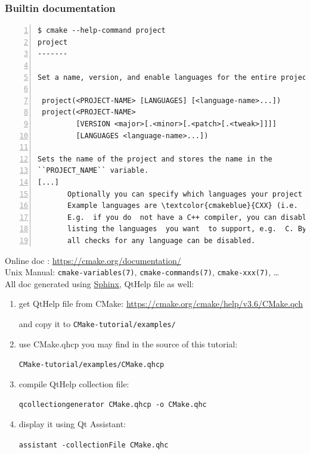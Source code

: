 \documentclass[compress,slidestop,table
              ]
               {beamer}
\begin{document}
\begin{frame}
\frametitle{Builtin documentation}
\begin{Verbatim}[commandchars=\\\{\},fontsize=\tiny,numbers=left,frame=topline,label=CMake builtin doc for 'project' command]
  $ cmake --help-command project
project
-------

Set a name, version, and enable languages for the entire project.

 project(<PROJECT-NAME> [LANGUAGES] [<language-name>...])
 project(<PROJECT-NAME>
         [VERSION <major>[.<minor>[.<patch>[.<tweak>]]]]
         [LANGUAGES <language-name>...])

Sets the name of the project and stores the name in the
``PROJECT_NAME`` variable.
[...]
       Optionally you can specify which languages your project supports.
       Example languages are \textcolor{cmakeblue}{CXX} (i.e.  C++), \textcolor{cmakeblue}{C}, \textcolor{cmakeblue}{Fortran}, etc.  By \textcolor{cmakered}{default C} \textcolor{cmakered}{and CXX are enabled}.
       E.g.  if you do  not have a C++ compiler, you can disable the check  for it by  explicitly
       listing the languages  you want  to support, e.g.  C. By using the special language "\textcolor{cmakeblue}{NONE}"
       all checks for any language can be disabled.
\end{Verbatim}
Online doc : \url{https://cmake.org/documentation/}\\
Unix Manual: {\scriptsize \texttt{cmake-variables(7)}, \texttt{cmake-commands(7)}, \texttt{cmake-xxx(7)}, \ldots}\\
All doc generated using \href{http://www.sphinx-doc.org/en/stable/builders.html}{Sphinx},
QtHelp file as well:\\
\begin{small}
\begin{enumerate}
\item get QtHelp file from CMake: \url{https://cmake.org/cmake/help/v3.6/CMake.qch}

      and copy it to \texttt{CMake-tutorial/examples/}
\item use CMake.qhcp you may find in the source of this tutorial:

      \texttt{CMake-tutorial/examples/CMake.qhcp}
\item compile QtHelp collection file:

      \texttt{qcollectiongenerator CMake.qhcp -o CMake.qhc}
\item display it using Qt Assistant:

  \texttt{assistant -collectionFile CMake.qhc}
\end{enumerate}
\end{small}
\end{frame}
\end{document}
